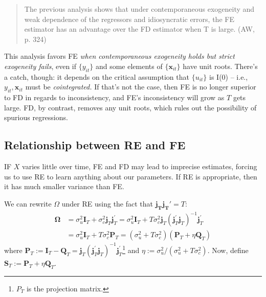 \documentclass[11pt, a4paper]{report}
\theoremstyle{plain}
\theoremstyle{plain}
\theoremstyle{remark}
\begin{document}
\begin{quote}
    The previous analysis shows that under contemporaneous exogeneity and weak
dependence of the regressors and idiosyncratic errors, the FE estimator has an advantage over the FD estimator when T is large. (AW, p. 324)
\end{quote}

This analysis favors FE \textit{when contemporaneous exogeneity holds but strict exogeneity fails}, even if $\{y_{it}\}$ and some elements of $\{\mathbf{x}_{it}\}$ have unit roots. There's a catch, though: it depends on the critical assumption that $\{u_{it}\}$ is I(0) -- i.e., $y_{it}, \mathbf{x}_{it}$ must be \textit{cointegrated.} If that's not the case, then FE is no longer superior to FD in regards to inconsistency, and FE's inconsistency will grow as $T$ gets large. FD, by contrast, removes any unit roots, which rules out the possibility of spurious regressions. 

\subsection{Relationship between RE and FE}

IF $X$ varies little over time, FE and FD may lead to imprecise estimates, forcing us to use RE to learn anything about our parameters. If RE is appropriate, then it has much smaller variance than FE.

We can rewrite $\Omega$ under RE using the fact that $\mathbf{j_T j_T}' = T$:
\begin{equation}
    \begin{aligned}
    \boldsymbol{\Omega} &=\sigma_{u}^{2} \mathbf{I}_{T}+\sigma_{c}^{2} \mathbf{j}_{T} \mathbf{j}_{T}^{\prime}=\sigma_{u}^{2} \mathbf{I}_{T}+T \sigma_{c}^{2} \mathbf{j}_{T}\left(\mathbf{j}_{T}^{\prime} \mathbf{j}_{T}\right)^{-1} \mathbf{j}_{T}^{\prime} \\
    &=\sigma_{u}^{2} \mathbf{I}_{T}+T \sigma_{c}^{2} \mathbf{P}_{T}=\left(\sigma_{u}^{2}+T \sigma_{c}^{2}\right)\left(\mathbf{P}_{T}+\eta \mathbf{Q}_{T}\right)
    \end{aligned}
    \end{equation}
where $\mathbf{P}_{T} := \mathbf{I}_{T}-\mathbf{Q}_{T}=\mathbf{j}_{T}\left(\mathbf{j}_{T}^{\prime} \mathbf{j}_{T}\right)^{-1} \mathbf{j}_{T}^{\prime}$\footnote{$P_T$ is the projection matrix.} and $\eta := \sigma_{u}^{2} /\left(\sigma_{u}^{2}+T \sigma_{c}^{2}\right)$. Now, define $\mathbf{S}_T := \mathbf{P}_T + \eta \mathbf{Q}_T$. 
\end{document}
